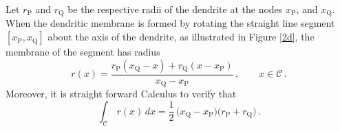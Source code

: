 Let $r_\mathrm{P}$ and $r_\mathrm{Q}$ be the respective radii of
the dendrite at the nodes $x_\mathrm{P}$, and $x_\mathrm{Q}$. When
the dendritic membrane is formed by rotating the straight line
segment $[x_\mathrm{P},x_\mathrm{Q}]$ about the axis of the
dendrite, as illustrated in Figure \ref{2d}, the membrane of the
segment has radius
\begin{equation}\label{car2}
r(x) = \frac{r_\mathrm{P}(x_\mathrm{Q}-x)
+r_\mathrm{Q}(x-x_\mathrm{P})}{x_\mathrm{Q}-x_\mathrm{P}}\,,
\qquad x\in\mathcal{C}\,.
\end{equation}
Moreover, it is straight forward Calculus to verify that
\begin{equation}\label{dc1}
\int_\mathcal{C}\,r(x)\,dx=
\frac{1}{2}\,\big(x_\mathrm{Q}-x_\mathrm{P}\big)
\big(r_\mathrm{P}+r_\mathrm{Q}\big)\,.
\end{equation}

